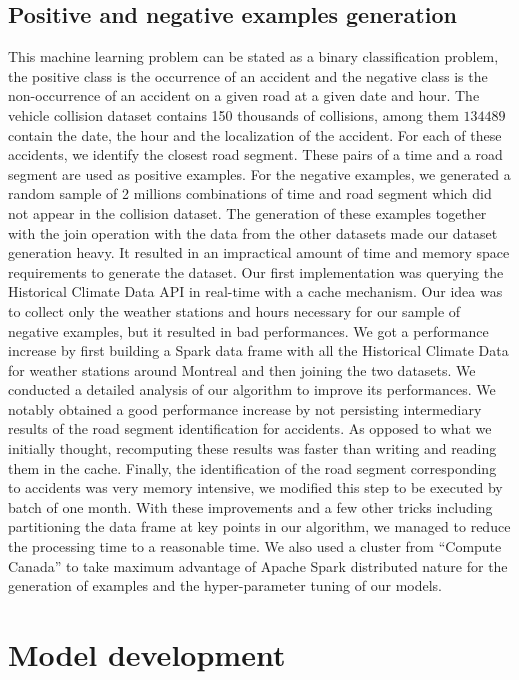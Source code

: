\documentclass[conference]{IEEEtran}
\begin{document}
\subsection{Positive and negative examples generation}
This machine learning problem can be stated as a binary classification problem, the positive class is the occurrence of an accident and the negative class is the non-occurrence of an accident on a given road at a given date and hour. The vehicle collision dataset contains 150 thousands of collisions, among them $134 489$ contain the date, the hour and the localization of the accident. For each of these accidents, we identify the closest road segment. These pairs of a time and a road segment are used as positive examples. For the negative examples, we generated a random sample of 2 millions combinations of time and road segment which did not appear in the collision dataset.  The generation of these examples together with the join operation with the data from the other datasets made our dataset generation heavy. It resulted in an impractical amount of time and memory space requirements to generate the dataset. Our first implementation was querying the Historical Climate Data API in real-time with a cache mechanism. Our idea was to collect only the weather stations and hours necessary for our sample of negative examples, but it resulted in bad performances. We got a performance increase by first building a Spark data frame with all the Historical Climate Data for weather stations around Montreal and then joining the two datasets. We conducted a detailed analysis of our algorithm to improve its performances. We notably obtained a good performance increase by not persisting intermediary results of the road segment identification for accidents. As opposed to what we initially thought, recomputing these results was faster than writing and reading them in the cache. Finally, the identification of the road segment corresponding to accidents was very memory intensive, we modified this step to be executed by batch of one month.  With these improvements and a few other tricks including partitioning the data frame at key points in our algorithm, we managed to reduce the processing time to a reasonable time. We also used a cluster from “Compute Canada” to take maximum advantage of Apache Spark distributed nature for the generation of examples and the hyper-parameter tuning of our models.


\section{Model development}
\end{document}
